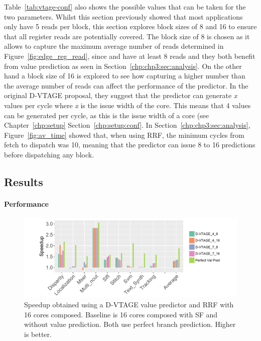 Table~\ref{tab:vtage-conf} also shows the possible values that can be taken for the two parameters.
Whilst this section previously showed that most applications only have 5 reads per block, this section explores block sizes of 8 and 16 to ensure that all register reads are potentially covered. 
The block size of 8 is chosen as it allows to capture the maximum average number of reads determined in Figure~\ref{fig:edge_reg_read}, since  and  have at least 8 reads and they both benefit from value prediction as seen in Section~\ref{chp:chp3:sec:analysis}.
On the other hand a block size of 16 is explored to see how capturing a higher number than the average number of reads can affect the performance of the predictor. 
In the original D-VTAGE proposal, they suggest that the predictor can generate \textit{x} values per cycle where \textit{x} is the issue width of the core.
This means that 4 values can be generated per cycle, as this is the issue width of a core (see Chapter~\ref{chp:setup} Section~\ref{chp:setup:conf}.
In Section~\ref{chp:chp3:sec:analysis}, Figure~\ref{fig:av_time} showed that, when using RRF, the minimum cycles from fetch to dispatch was 10, meaning that the predictor can issue 8 to 16 predictions before dispatching any block.


\subsection{Results}

\paragraph*{Performance}

\begin{figure}[t]
    \centering
    \includegraphics[width=1\textwidth]{chapter3/graphics/vtage_speed2.pdf}
    \caption{Speedup obtained using a D-VTAGE value predictor and RRF with 16 cores composed. Baseline is 16 cores composed with SF and without value prediction. Both use perfect branch prediction. Higher is better.}
    \label{fig:vtage_perf}
	\vspace{1em}
\end{figure}

